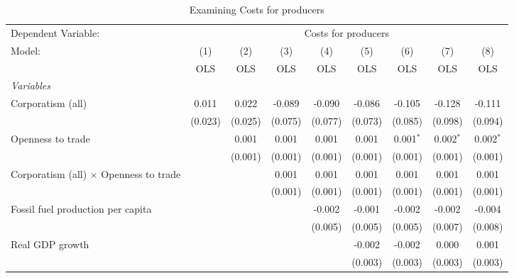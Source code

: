 
\begin{table}[htbp]
   \caption{Examining Costs for producers}
   \centering
   \begin{tabular}{lcccccccc}
      \toprule
      Dependent Variable: & \multicolumn{8}{c}{Costs for producers}\\
      Model:                                        & (1)     & (2)     & (3)     & (4)     & (5)     & (6)         & (7)         & (8)\\  
                                                    &  OLS    & OLS     & OLS     & OLS     & OLS     & OLS         & OLS         & OLS\\  
      \midrule
      \emph{Variables}\\
      Corporatism (all)                             & 0.011   & 0.022   & -0.089  & -0.090  & -0.086  & -0.105      & -0.128      & -0.111\\   
                                                    & (0.023) & (0.025) & (0.075) & (0.077) & (0.073) & (0.085)     & (0.098)     & (0.094)\\   
      Openness to trade                             &         & 0.001   & 0.001   & 0.001   & 0.001   & 0.001$^{*}$ & 0.002$^{*}$ & 0.002$^{*}$\\   
                                                    &         & (0.001) & (0.001) & (0.001) & (0.001) & (0.001)     & (0.001)     & (0.001)\\   
      Corporatism (all) $\times$ Openness to trade  &         &         & 0.001   & 0.001   & 0.001   & 0.001       & 0.001       & 0.001\\   
                                                    &         &         & (0.001) & (0.001) & (0.001) & (0.001)     & (0.001)     & (0.001)\\   
      Fossil fuel production per capita             &         &         &         & -0.002  & -0.001  & -0.002      & -0.002      & -0.004\\   
                                                    &         &         &         & (0.005) & (0.005) & (0.005)     & (0.007)     & (0.008)\\   
      Real GDP growth                               &         &         &         &         & -0.002  & -0.002      & 0.000       & 0.001\\   
                                                    &         &         &         &         & (0.003) & (0.003)     & (0.003)     & (0.003)\\   

\end{tabular}
\end{table}
